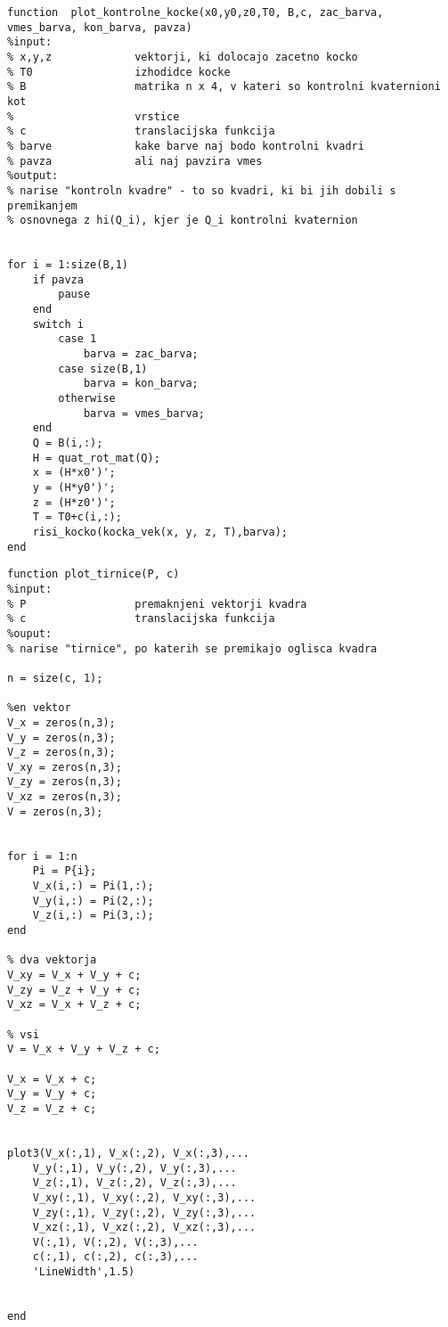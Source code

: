 \documentclass[12pt,a4paper,twoside]{article}
\theoremstyle{definition} %
\theoremstyle{plain} %
\numberwithin{equation}{section}  %
\begin{document}
\begin{lstlisting}[caption = {plot\_kontrolne\_kocke}]
function  plot_kontrolne_kocke(x0,y0,z0,T0, B,c, zac_barva, vmes_barva, kon_barva, pavza)
%input:
% x,y,z             vektorji, ki dolocajo zacetno kocko
% T0                izhodidce kocke
% B                 matrika n x 4, v kateri so kontrolni kvaternioni kot 
%                   vrstice
% c                 translacijska funkcija
% barve             kake barve naj bodo kontrolni kvadri
% pavza             ali naj pavzira vmes
%output:
% narise "kontroln kvadre" - to so kvadri, ki bi jih dobili s premikanjem
% osnovnega z hi(Q_i), kjer je Q_i kontrolni kvaternion


for i = 1:size(B,1)
    if pavza
        pause
    end
    switch i
        case 1
            barva = zac_barva;
        case size(B,1)
            barva = kon_barva;
        otherwise
            barva = vmes_barva;
    end
    Q = B(i,:);
    H = quat_rot_mat(Q);
    x = (H*x0')';
    y = (H*y0')';
    z = (H*z0')';
    T = T0+c(i,:);
    risi_kocko(kocka_vek(x, y, z, T),barva);
end
\end{lstlisting}

\begin{lstlisting}[caption = {plot\_tirnice}]
function plot_tirnice(P, c)
%input:
% P                 premaknjeni vektorji kvadra
% c                 translacijska funkcija
%ouput:
% narise "tirnice", po katerih se premikajo oglisca kvadra

n = size(c, 1);

%en vektor
V_x = zeros(n,3);
V_y = zeros(n,3);
V_z = zeros(n,3);
V_xy = zeros(n,3);
V_zy = zeros(n,3);
V_xz = zeros(n,3);
V = zeros(n,3);


for i = 1:n
    Pi = P{i};
    V_x(i,:) = Pi(1,:);
    V_y(i,:) = Pi(2,:);
    V_z(i,:) = Pi(3,:); 
end

% dva vektorja
V_xy = V_x + V_y + c;
V_zy = V_z + V_y + c;
V_xz = V_x + V_z + c;

% vsi
V = V_x + V_y + V_z + c;

V_x = V_x + c;
V_y = V_y + c;
V_z = V_z + c;


plot3(V_x(:,1), V_x(:,2), V_x(:,3),...
    V_y(:,1), V_y(:,2), V_y(:,3),...
    V_z(:,1), V_z(:,2), V_z(:,3),...
    V_xy(:,1), V_xy(:,2), V_xy(:,3),...
    V_zy(:,1), V_zy(:,2), V_zy(:,3),...
    V_xz(:,1), V_xz(:,2), V_xz(:,3),...
    V(:,1), V(:,2), V(:,3),...
    c(:,1), c(:,2), c(:,3),...
    'LineWidth',1.5)


end
\end{lstlisting}
\end{document}
